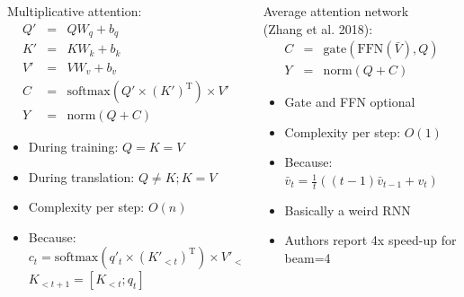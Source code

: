\documentclass[aspectratio=169]{beamer}					%
\newcommand{\Trans}[1]{#1^\mathrm{T}}
\begin{document}
\begin{frame}{}
\begin{columns}
\begin{column}[t]{0.45\textwidth}
Multiplicative attention:
\begin{eqnarray*}
Q'&=& QW_q + b_q \\
K' &=& KW_k + b_k \\
V' &=& VW_v + b_v \\
C &=& \mathrm{softmax}(Q'\times\Trans{(K')}) \times V' \\
Y &=& \mathrm{norm}(Q + C)
\end{eqnarray*}
\begin{itemize}
\item During training: $ Q = K = V $
\item During translation: $ Q \neq K; K = V $
\item Complexity per step: $O(n)$
\item Because: $c_t = \mathrm{softmax}(q'_t \times \Trans{(K'_{<t})})\times V'_{<t}$\\
$K_{<t+1} = [K_{<t} ; q_t]$
\end{itemize}\vfill
\end{column}
\hspace{-1cm} \pause
\begin{column}[t]{0.45\textwidth}
Average attention network\\ (Zhang et al. 2018):
\begin{eqnarray*}
C &=& \mathrm{gate}(\mathrm{FFN}(\bar{V}), Q) \\
Y &=& \mathrm{norm}(Q + C)
\end{eqnarray*}
\begin{itemize}
\item Gate and FFN optional
\item Complexity per step: $O(1)$
\item Because: $\bar{v}_t = \frac{1}{t}((t-1)\bar{v}_{t-1} + v_t)$
\item Basically a weird RNN
\item Authors report 4x speed-up for beam=4
\end{itemize}\vfill
\end{column}
\end{columns}
\end{frame}
\end{document}
